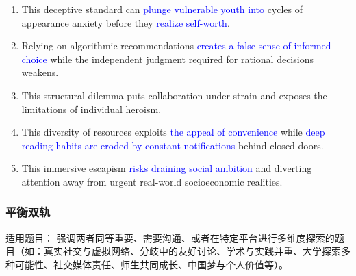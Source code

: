 \begin{enumerate}
    \item  This deceptive standard can \textcolor{blue}{plunge vulnerable youth into} cycles of appearance anxiety before they \textcolor{blue}{realize  self-worth}. 
    \item  Relying on algorithmic recommendations \textcolor{blue}{creates a false sense of informed choice} while the independent judgment required for rational decisions weakens.
    \item This structural dilemma puts collaboration under strain and exposes the limitations of individual heroism. 
    \item This diversity of resources exploits \textcolor{blue}{the appeal of convenience} while \textcolor{blue}{deep reading habits are eroded by constant notifications} behind closed doors.
    \item This immersive escapism \textcolor{blue}{risks draining social ambition} and diverting attention away from urgent real-world socioeconomic realities. 
\end{enumerate}

\subsubsection{平衡双轨}

适用题目： 强调两者同等重要、需要沟通、或者在特定平台进行多维度探索的题目（如：真实社交与虚拟网络、分歧中的友好讨论、学术与实践并重、大学探索多种可能性、社交媒体责任、师生共同成长、中国梦与个人价值等）。

